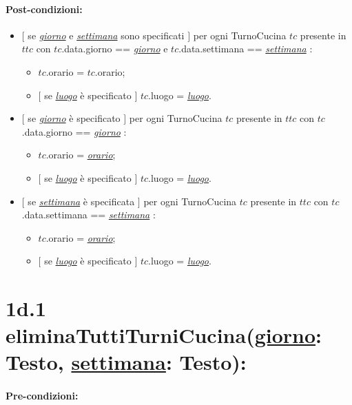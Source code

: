 \paragraph{Post-condizioni:} 
 \begin{itemize}
   \item $[$ se \underline{\textit{giorno}} e \underline{\textit{settimana}} sono specificati $]$ \textlangle per ogni TurnoCucina $tc$ presente in $ttc$ con $tc$.data.giorno == \underline{\textit{giorno}} e $tc$.data.settimana == \underline{\textit{settimana}} \textrangle:
\begin{itemize}
  \item $tc$.orario = $tc$.orario;
  \item $[$ se \underline{\textit{luogo}} è specificato $]$ $tc$.luogo = \underline{\textit{luogo}}.
\end{itemize}
   \item $[$ se \underline{\textit{giorno}} è specificato $]$ \textlangle per ogni TurnoCucina $tc$ presente in $ttc$ con $tc$.data.giorno == \underline{\textit{giorno}} \textrangle:
\begin{itemize}
  \item $tc$.orario = \underline{\textit{orario}};
  \item $[$ se \underline{\textit{luogo}} è specificato $]$ $tc$.luogo = \underline{\textit{luogo}}.
\end{itemize}
   \item $[$ se \underline{\textit{settimana}} è specificata $]$ \textlangle per ogni TurnoCucina $tc$ presente in $ttc$ con $tc$.data.settimana == \underline{\textit{settimana}} \textrangle:
\begin{itemize}
  \item $tc$.orario = \underline{\textit{orario}};
  \item $[$ se \underline{\textit{luogo}} è specificato $]$ $tc$.luogo = \underline{\textit{luogo}}.
\end{itemize}

\end{itemize}

\section*{1d.1 eliminaTuttiTurniCucina(\underline{giorno}: Testo, \underline{settimana}: Testo):}

\paragraph{Pre-condizioni:}

